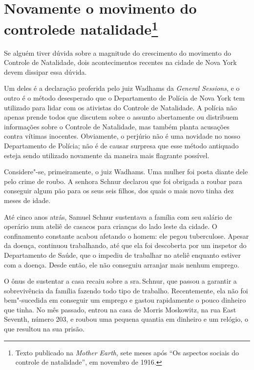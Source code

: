 \chapter[Novamente o movimento do controle de natalidade]{Novamente o movimento do controle\break de natalidade\footnote{Texto publicado
  na \emph{Mother Earth}, sete meses após ``Os aspectos sociais do
  controle de natalidade'', em novembro de 1916.}}

Se alguém tiver dúvida sobre a magnitude do crescimento do movimento do
Controle de Natalidade, dois acontecimentos recentes na cidade de Nova
York devem dissipar essa dúvida.

Um deles é a declaração proferida pelo juiz Wadhams da \emph{General
Sessions}, e o outro é o método desesperado que o Departamento de
Polícia de Nova York tem utilizado para lidar com os ativistas do
Controle de Natalidade. A polícia não apenas prende todos que discutem
sobre o assunto abertamente ou distribuem informações sobre o Controle
de Natalidade, mas também planta acusações contra vítimas inocentes.
Obviamente, o perjúrio não é uma novidade no nosso Departamento de
Polícia; não é de causar surpresa que esse método antiquado esteja sendo
utilizado novamente da maneira mais flagrante possível.

Considere"-se, primeiramente, o juiz Wadhams. Uma mulher foi posta diante
dele pelo crime de roubo. A senhora Schnur declarou que foi obrigada a
roubar para conseguir algum pão para os seus seis filhos, dos quais o
mais novo tinha dez meses de idade.

Até cinco anos atrás, Samuel Schnur sustentava a família com seu
salário de operário num ateliê de casacos para crianças do lado leste da
cidade. O confinamento constante acabou afetando o homem: ele pegou
tuberculose. Apesar da doença, continuou trabalhando, até que ela foi
descoberta por um inspetor do Departamento de Saúde, que o impediu de
trabalhar no ateliê enquanto estiver com a doença. Desde então, ele não
conseguiu arranjar mais nenhum emprego.

O ônus de sustentar a casa recaiu sobre a sra.\,Schnur, que passou a
garantir a sobrevivência da família fazendo todo tipo de trabalho.
Recentemente, ela não foi bem"-sucedida em conseguir um emprego e gastou
rapidamente o pouco dinheiro que tinha. No mês passado, entrou na casa
de Morris Moskowitz, na rua East Seventh, número 203, e roubou uma
pequena quantia em dinheiro e um relógio, o que resultou na sua prisão.

